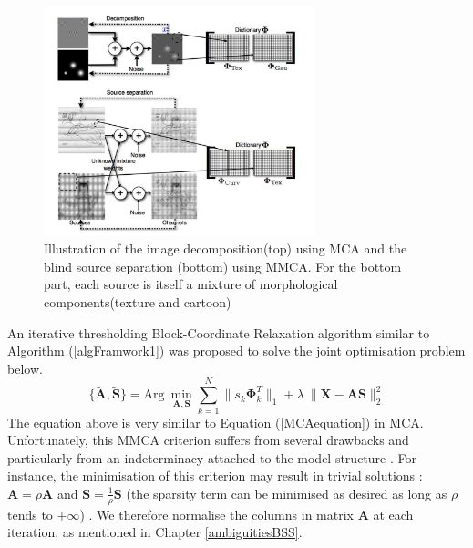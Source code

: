 \begin{figure}[!htbp]
\centering
\includegraphics[width=0.7\textwidth]{images/mca_gmca.png}
\caption{Illustration of the image decomposition(top) using MCA and the blind source separation (bottom) using MMCA. For the bottom part, each source is itself a mixture of morphological components(texture and cartoon)}
\label{illu_mca_and_gmca}
\end{figure}

An iterative thresholding Block-Coordinate Relaxation algorithm similar to Algorithm (\ref{algFramwork1}) was proposed to solve the joint optimisation problem below.
\begin{equation}
    \{\mathbf{\tilde{A},\tilde{S}}\} = \text{Arg} \: \min_{\mathbf{A},\mathbf{S}}\sum_{k=1}^N \lVert s_k \mathbf{\Phi}_k^T \rVert_{1} + \lambda \:\lVert \mathbf{X} - \mathbf{AS} \rVert^2_2
    \label{MMCAequation}
\end{equation}
The equation above is very similar to Equation (\ref{MCAequation}) in MCA. Unfortunately, this MMCA criterion suffers from several drawbacks and particularly from an indeterminacy attached to the model structure \cite{BobinJ_2007SaMD}. For instance, the minimisation of this criterion may result in trivial solutions : $\mathbf{A} = \rho \mathbf{A}$ and $\mathbf{S} = \frac{1}{\rho} \mathbf{S}$ (the sparsity term can be minimised as desired as long as $\rho$ tends to $+\infty$) \cite{BobinJ_2007SaMD}. We therefore normalise the columns in matrix $\mathbf{A}$ at each iteration, as mentioned in Chapter \ref{ambiguitiesBSS}.\\

